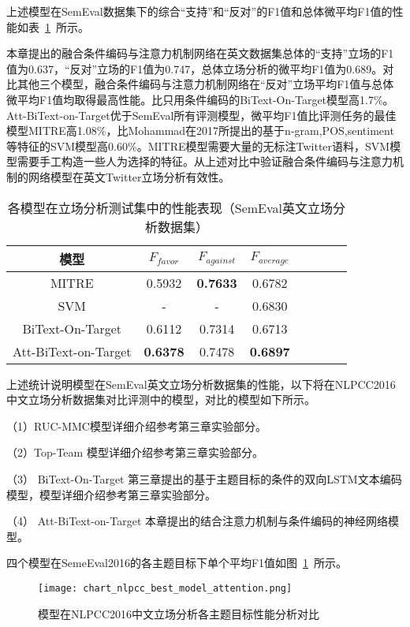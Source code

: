 上述模型在SemEval数据集下的综合“支持”和“反对”的F1值和总体微平均F1值的性能如表~\ref{semeval_attention_res}~所示。


本章提出的融合条件编码与注意力机制网络在英文数据集总体的“支持”立场的F1值为0.637，“反对”立场的F1值为0.747，总体立场分析的微平均F1值为0.689。对比其他三个模型，融合条件编码与注意力机制网络在“反对”立场平均F1值与总体微平均F1值均取得最高性能。比只用条件编码的BiText-On-Target模型高1.7\%。Att-BiText-on-Target优于SemEval所有评测模型，微平均F1值比评测任务的最佳模型MITRE高1.08\%，比Mohammad在2017所提出的基于n-gram,POS,sentiment等特征的SVM模型高0.60\%。MITRE模型需要大量的无标注Twitter语料，SVM模型需要手工构造一些人为选择的特征。从上述对比中验证融合条件编码与注意力机制的网络模型在英文Twitter立场分析有效性。

\begin{table}[htbp]
	\caption[table123]{各模型在立场分析测试集中的性能表现（SemEval英文立场分析数据集）}
	\vspace{0.5em}\centering\wuhao
	\label{semeval_attention_res}
	\begin{tabular}{cccccccc}
		\toprule[1.5pt]
		模型& $F_{favor}$&$F_{against}$&$F_{average}$ \\
		\midrule[1pt]
		MITRE\citeup{zarrella2016mitre}&0.5932&\textbf{0.7633}&0.6782\\
		SVM\citeup{mohammadstance} &-&-&0.6830\\
		BiText-On-Target&0.6112&0.7314&0.6713\\
			Att-BiText-on-Target&\textbf{0.6378}&0.7478&\textbf{0.6897}\\
		\bottomrule[1.5pt]
	\end{tabular}
\end{table}

上述统计说明模型在SemEval英文立场分析数据集的性能，以下将在NLPCC2016中文立场分析数据集对比评测中的模型，对比的模型如下所示。

（1）RUC-MMC模型详细介绍参考第三章实验部分。

（2）Top-Team 模型详细介绍参考第三章实验部分。

（3） BiText-On-Target 第三章提出的基于主题目标的条件的双向LSTM文本编码模型，模型详细介绍参考第三章实验部分。

（4） Att-BiText-on-Target 本章提出的结合注意力机制与条件编码的神经网络模型。

四个模型在SemeEval2016的各主题目标下单个平均F1值如图~\ref{chart_nlpcc_best_model_attention}~所示。
\begin{figure}[htbp]
	\centering
	\texttt{[image: chart\_nlpcc\_best\_model\_attention.png]}
	\caption[rnn_vanish]{模型在NLPCC2016中文立场分析各主题目标性能分析对比}
	\label{chart_nlpcc_best_model_attention}
\end{figure}


